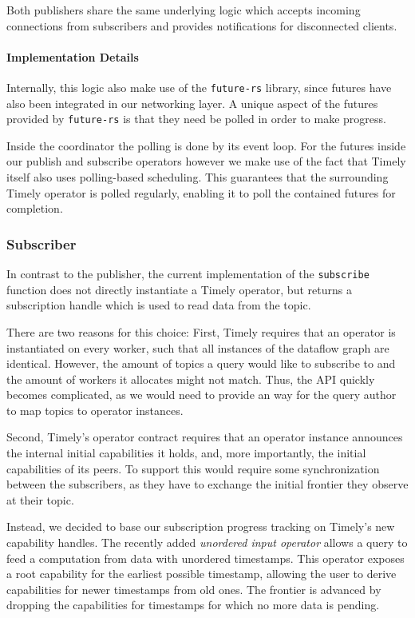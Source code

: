 Both publishers share the same underlying logic which accepts incoming connections
from subscribers and provides notifications for disconnected clients.



\paragraph{Implementation Details}


Internally, this logic also make use of the \lstinline{future-rs} library, 
since futures have also been integrated in our networking layer. A unique
aspect of the futures provided by \lstinline{future-rs} is that they need
be polled in order to make progress.

Inside the coordinator the polling is done by its event loop. For the futures
inside our publish and subscribe operators however we make use of the fact
that Timely itself also uses polling-based scheduling. This guarantees that
the surrounding Timely operator is polled regularly, enabling it to poll
the contained futures for completion.

\subsubsection{Subscriber}

In contrast to the publisher, the current implementation of the \lstinline{subscribe}
function does not directly instantiate a Timely operator, but returns a subscription
handle which is used to read data from the topic.

There are two reasons for this choice: First, Timely requires that an operator
is instantiated on every worker, such that all instances of the dataflow graph
are identical. However, the amount of topics a query would like to subscribe
to and the amount of workers it allocates might not match. Thus, the API
quickly becomes complicated, as we would need to provide an way for the 
query author to map topics to operator instances.

Second, Timely's operator contract requires that an operator instance announces
the internal initial capabilities it holds, and, more importantly, the initial
capabilities of its peers. To support this would require some synchronization
between the subscribers, as they have to exchange the initial frontier they
observe at their topic.

Instead, we decided to base our subscription progress tracking on Timely's new
capability handles. The recently added \emph{unordered input operator} allows
a query to feed a computation from data with unordered timestamps. This operator
exposes a root capability for the earliest possible timestamp, allowing the user
to derive capabilities for newer timestamps from old ones. The frontier
is advanced by dropping the capabilities for timestamps for which no more data
is pending.

